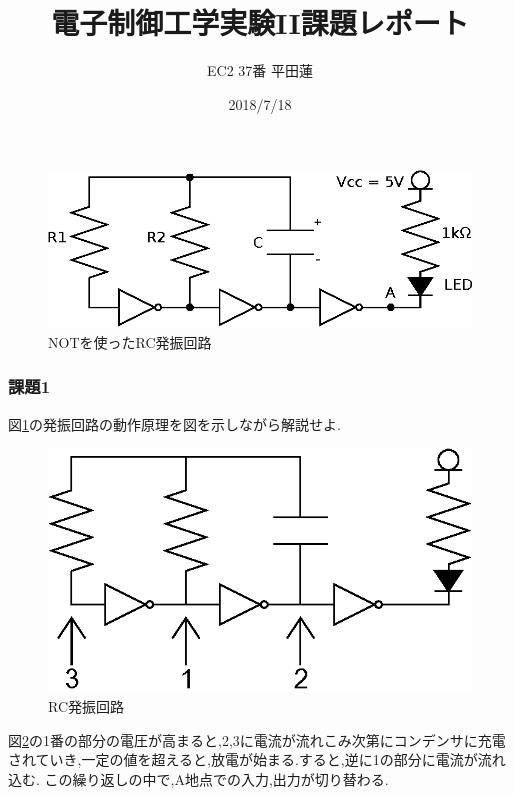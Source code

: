 \documentclass[uplatex]{jsarticle}
\title{電子制御工学実験II課題レポート}
\author{EC2 37番 平田蓮}
\date{2018/7/18}
\begin{document}
    \begin{figure}[h]
        \begin{center}
            \includegraphics{1.eps}
            \caption{NOTを使ったRC発振回路}
            \label{NOTを使ったRC発振回路}
        \end{center}
    \end{figure}
    \subsubsection*{課題1}
        図\ref{NOTを使ったRC発振回路}の発振回路の動作原理を図を示しながら解説せよ.\par
        \begin{figure}[h]
            \begin{center}
                \includegraphics{2.eps}
                \caption{RC発振回路}
                \label{RC発振回路}
            \end{center}
        \end{figure}
        図\ref{RC発振回路}の1番の部分の電圧が高まると,2,3に電流が流れこみ次第にコンデンサに充電されていき,一定の値を超えると,放電が始まる.すると,逆に1の部分に電流が流れ込む.
        この繰り返しの中で,A地点での入力,出力が切り替わる.
    \newpage
\end{document}
